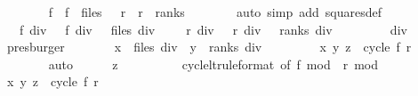 \begin{isabellebody}
\ \ \ \ \isamarkupfalse%
\ {\isachardoublequoteopen}{}\ {\isasymle}\ f\ {\isasymand}\ f\ {\isacharless}\ files{\isachardoublequoteclose}\ {\isachardoublequoteopen}{}\ {\isasymle}\ r\ {\isasymand}\ r\ {\isacharless}\ ranks{\isachardoublequoteclose}\isanewline
\ \ \ \ \ \ \isamarkupfalse%
\ {\isacharparenleft}auto\ simp\ add{\isacharcolon}\ squares{\isacharunderscore}def{\isacharparenright}\isanewline
\ \ \ \ \isamarkupfalse%
\ {\isachardoublequoteopen}{}\ {\isasymle}\ f\ div\ {}\ {\isasymand}\ f\ div\ {}\ {\isacharless}\ files\ div\ {}{\isachardoublequoteclose}\ \ {\isachardoublequoteopen}{}\ {\isasymle}\ r\ div\ {}\ {\isasymand}\ r\ div\ {}\ {\isacharless}\ ranks\ div\ {}{\isachardoublequoteclose}\isanewline
\ \ \ \ \ \ \isamarkupfalse%
\ div{}\isanewline
\ \ \ \ \ \ \isamarkupfalse%
\ presburger{\isacharplus}\isanewline
\ \ \ \ \isamarkupfalse%
\ \isamarkupfalse%
\ {\isachardoublequoteopen}x\ {\isasymin}\ {\isacharbraceleft}{}{\isachardot}{\isachardot}{\isacharless}files\ div\ {}{\isacharbraceright}{\isachardoublequoteclose}\ {\isachardoublequoteopen}y\ {\isasymin}\ {\isacharbraceleft}{}{\isachardot}{\isachardot}{\isacharless}ranks\ div\ {}{\isacharbraceright}{\isachardoublequoteclose}\isanewline
\ \ \ \ \ \ \isamarkupfalse%
\ {\isacharbackquoteopen}{\isacharparenleft}x{\isacharcomma}\ y{\isacharcomma}\ z{\isacharparenright}\ {\isacharequal}\ cycle\ {\isacharparenleft}f{\isacharcomma}\ r{\isacharparenright}{\isacharbackquoteclose}\isanewline
\ \ \ \ \ \ \isamarkupfalse%
\ auto\isanewline
\ \ \ \ \isamarkupfalse%
\ {\isachardoublequoteopen}z\ {\isasymin}\ {\isacharbraceleft}{}{\isachardot}{\isachardot}{\isacharless}{}{\isacharbraceright}{\isachardoublequoteclose}\isanewline
\ \ \ \ \ \ \isamarkupfalse%
\ cycle{\isacharunderscore}lt{\isacharunderscore}{}{\isacharbrackleft}rule{\isacharunderscore}format{\isacharcomma}\ of\ {\isachardoublequoteopen}f\ mod\ {}{\isachardoublequoteclose}\ {\isachardoublequoteopen}r\ mod\ {}{\isachardoublequoteclose}{\isacharbrackright}\isanewline
\ \ \ \ \ \ \isamarkupfalse%
\ {\isacharbackquoteopen}{\isacharparenleft}x{\isacharcomma}\ y{\isacharcomma}\ z{\isacharparenright}\ {\isacharequal}\ cycle\ {\isacharparenleft}f{\isacharcomma}\ r{\isacharparenright}{\isacharbackquoteclose}\isanewline

\end{isabellebody}
